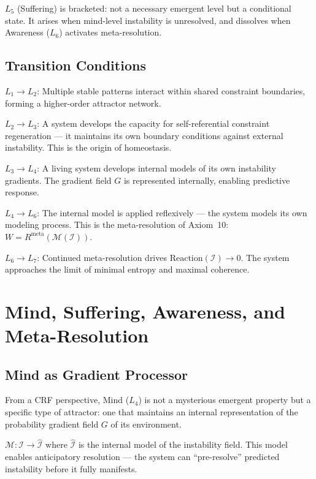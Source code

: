 \documentclass[12pt, a4paper]{article}
\begin{document}
$L_5$ (Suffering) is bracketed: not a necessary emergent level but a conditional state.
It arises when mind-level instability is unresolved, and dissolves when Awareness ($L_6$)
activates meta-resolution.

\subsection{Transition Conditions}

$L_1 \to L_2$: Multiple stable patterns interact within shared constraint boundaries,
forming a higher-order attractor network.

$L_2 \to L_3$: A system develops the capacity for self-referential constraint
regeneration --- it maintains its own boundary conditions against external instability.
This is the origin of homeostasis.

$L_3 \to L_4$: A living system develops internal models of its own instability gradients.
The gradient field $G$ is represented internally, enabling predictive response.

$L_4 \to L_6$: The internal model is applied reflexively --- the system models its own
modeling process. This is the meta-resolution of Axiom~10:
$W = R^{\mathrm{meta}}(\mathcal{M}(\mathcal{I}))$.

$L_6 \to L_7$: Continued meta-resolution drives $\mathrm{Reaction}(\mathcal{I}) \to 0$.
The system approaches the limit of minimal entropy and maximal coherence.

\section{Mind, Suffering, Awareness, and Meta-Resolution}

\subsection{Mind as Gradient Processor}

From a CRF perspective, Mind ($L_4$) is not a mysterious emergent property but a specific
type of attractor: one that maintains an internal representation of the probability gradient
field $G$ of its environment.

$\mathcal{M}: \mathcal{I} \to \hat{\mathcal{I}}$ where $\hat{\mathcal{I}}$ is the internal
model of the instability field. This model enables anticipatory resolution --- the system
can ``pre-resolve'' predicted instability before it fully manifests.
\end{document}
